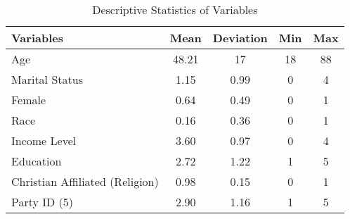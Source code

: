 \documentclass[document]{cup-journal}
\begin{document}
\begin{table}[H]
  \caption{Descriptive Statistics of Variables}
    \label{Table 1}
      \begin{tabular}{| l | c | c | c | c |}
\hline
\toprule
        \headrow \textbf{Variables} & \textbf{Mean} & \textbf{Deviation} & \textbf{Min} & \textbf{Max}\\
\midrule
    Age & 48.21 & 17 & 18 & 88\\ 
    \midrule
    Marital Status & 1.15 & 0.99 & 0 & 4\\ 
    \midrule
    Female & 0.64 & 0.49 & 0 & 1\\ 
    \midrule
    Race & 0.16 & 0.36 & 0 & 1\\ 
    \midrule
    Income Level & 3.60 & 0.97 & 0 & 4\\ 
    \midrule
    Education & 2.72 & 1.22 & 1 & 5\\ 
    \midrule
    Christian Affiliated (Religion) & 0.98 & 0.15 & 0 & 1\\ 
    \midrule
    Party ID (5) & 2.90 & 1.16 & 1 & 5\\ 
      \bottomrule
  \end{tabular}
\end{table}
\end{document}
